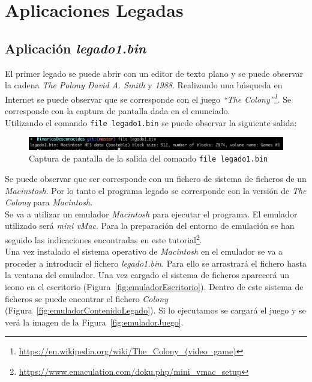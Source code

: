 \documentclass{article}
\begin{document}
\section{Aplicaciones Legadas}

\subsection{Aplicación \textit{legado1.bin}}

El primer legado se puede abrir con un editor de texto plano y se puede observar la cadena \textit{The Polony David A. Smith} y \textit{1988}. Realizando una búsqueda en Internet se puede observar que se corresponde con el juego \textit{``The Colony''\footnote{\url{https://en.wikipedia.org/wiki/The_Colony_(video_game)}}}. Se corresponde con la captura de pantalla dada en el enunciado.\\
Utilizando el comando \texttt{file legado1.bin} se puede observar la siguiente salida:

\begin{figure}[h!]
    \centering
    \includegraphics[scale=0.5]{images/file_legado1.png}
    \caption{Captura de pantalla de la salida del comando \texttt{file legado1.bin}}
    \label{fig:fileLegado1}
\end{figure}

Se puede observar que ser corresponde con un fichero de sistema de ficheros de un \textit{Macinstosh}. Por lo tanto el programa legado se corresponde con la versión de \textit{The Colony} para \textit{Macintosh}.\\

Se va a utilizar un emulador \textit{Macintosh} para ejecutar el programa. El emulador utilizado será \textit{mini vMac}. Para la preparación del entorno de emulación se han seguido las indicaciones encontradas en este tutorial\footnote{\url{https://www.emaculation.com/doku.php/mini_vmac_setup}}.\\
Una vez instalado el sistema operativo de \textit{Macintosh} en el emulador se va a proceder a introducir el fichero \textit{legado1.bin}. Para ello se arrastrará el fichero hasta la ventana del emulador. Una vez cargado el sistema de ficheros aparecerá un icono en el escritorio (Figura~\ref{fig:emuladorEscritorio}). Dentro de este sistema de ficheros se puede encontrar el fichero \textit{Colony} (Figura~\ref{fig:emuladorContenidoLegado}). Si lo ejecutamos se cargará el juego y se verá la imagen de la Figura~\ref{fig:emuladorJuego}.\\
\end{document}
